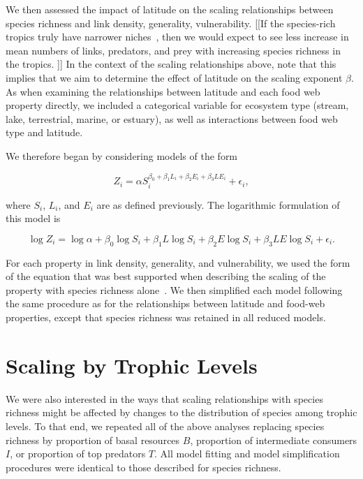 \documentclass[12pt]{article}
\begin{document}


  We then assessed the impact of latitude on the scaling relationships between species richness and 
  link density, generality, vulnerability.
  [[If the species-rich tropics truly have narrower 
  niches~\citep{Brown2004}, then we would expect to see less increase in mean numbers of links, 
  predators, and prey with increasing species richness in the tropics. ]]
  In the context of the scaling relationships above, note that this implies that we aim to determine the effect of latitude on
  the scaling exponent $\beta$. As when examining the relationships between latitude and each food 
  web property directly, we included a categorical variable for ecosystem type (stream, lake, 
  terrestrial, marine, or estuary), as well as interactions between food web type and latitude.


  We therefore began by considering models of the form

  \begin{equation}
  \label{PowerLat}
  Z_{i}=\alpha S_{i}^{\beta_{0}+\beta_{1}L_{i}+\beta_{2}E_{i}+\beta_{3}LE_{i}} + \epsilon_{i} ,
  \end{equation}

  \noindent where $S_{i}$, $L_{i}$, and $E_{i}$ are as defined previously. The logarithmic formulation of this model is

  \begin{equation}
  \label{LogLat}
  \log{Z_{i}} = \log{\alpha}+\beta_{0}\log{S_{i}} + \beta_{1}L\log{S_{i}} +\beta_{2}E\log{S_{i}} +\beta_{3}LE\log{S_{i}} +\epsilon_{i} .
  \end{equation}

  For each property in link density, generality, and vulnerability, we used the form of the equation that was best supported
  when describing the scaling of the property with species richness alone~\citep{Xiao2011}.
  We then simplified each model following the same procedure as for the relationships between
  latitude and food-web properties, except that species richness was retained in all reduced models. 


\section*{Scaling by Trophic Levels}

  We were also interested in the ways that scaling relationships with species richness might
  be affected by changes to the distribution of species among trophic levels. To
  that end, we repeated all of the above analyses replacing species richness by
  proportion of basal resources $B$, proportion of intermediate consumers $I$,
  or proportion of top predators $T$. All model fitting and model
  simplification procedures were identical to those described for species
  richness.
\end{document}

